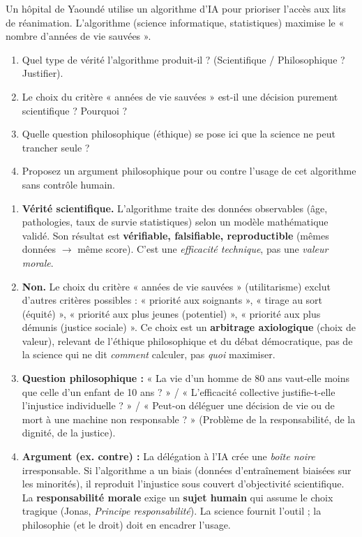\documentclass[11pt]{article}
\newcommand{\cle}[1]{{\popxbold\color{popdark}#1}}
\begin{document}
\begin{exercice}
Un hôpital de Yaoundé utilise un algorithme d'IA pour prioriser l'accès aux lits de réanimation. L'algorithme (science informatique, statistiques) maximise le « nombre d'années de vie sauvées ».
\begin{enumerate}
    \item Quel type de vérité l'algorithme produit-il ? (Scientifique / Philosophique ? Justifier).
    \item Le choix du critère « années de vie sauvées » est-il une décision purement scientifique ? Pourquoi ?
    \item Quelle question philosophique (éthique) se pose ici que la science ne peut trancher seule ?
    \item Proposez un argument philosophique pour ou contre l'usage de cet algorithme sans contrôle humain.
\end{enumerate}
\end{exercice}

\begin{corrige}
\begin{enumerate}
    \item \textbf{Vérité scientifique.} L'algorithme traite des données observables (âge, pathologies, taux de survie statistiques) selon un modèle mathématique validé. Son résultat est \textbf{vérifiable, falsifiable, reproductible} (mêmes données $\to$ même score). C'est une \emph{efficacité technique}, pas une \emph{valeur morale}.
    \item \textbf{Non.} Le choix du critère « années de vie sauvées » (utilitarisme) exclut d'autres critères possibles : « priorité aux soignants », « tirage au sort (équité) », « priorité aux plus jeunes (potentiel) », « priorité aux plus démunis (justice sociale) ». Ce choix est un \textbf{arbitrage axiologique} (choix de valeur), relevant de l'éthique philosophique et du débat démocratique, pas de la science qui ne dit \emph{comment} calculer, pas \emph{quoi} maximiser.
    \item \textbf{Question philosophique :} « La vie d'un homme de 80 ans vaut-elle moins que celle d'un enfant de 10 ans ? » / « L'efficacité collective justifie-t-elle l'injustice individuelle ? » / « Peut-on déléguer une décision de vie ou de mort à une machine non responsable ? » (Problème de la \cle{responsabilité}, de la \cle{dignité}, de la \cle{justice}).
    \item \textbf{Argument (ex. contre) :} La délégation à l'IA crée une \emph{boîte noire} irresponsable. Si l'algorithme a un biais (données d'entraînement biaisées sur les minorités), il reproduit l'injustice sous couvert d'objectivité scientifique. La \textbf{responsabilité morale} exige un \textbf{sujet humain} qui assume le choix tragique (Jonas, \emph{Principe responsabilité}). La science fournit l'outil ; la philosophie (et le droit) doit en encadrer l'usage.
\end{enumerate}
\end{corrige}
\end{document}
